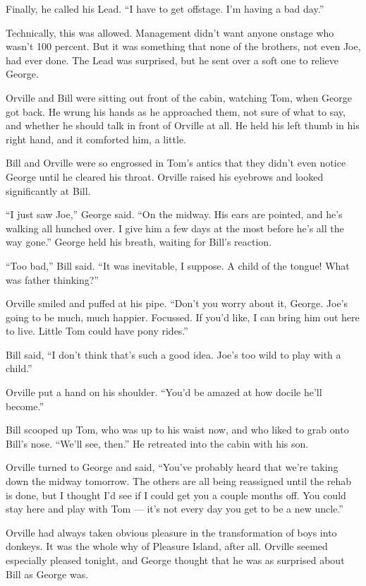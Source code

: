 Finally, he called his Lead.
``I have to get offstage. I'm having a bad day.''

Technically, this was allowed. Management didn't want anyone
onstage who wasn't 100 percent. But it was something that none of
the brothers, not even Joe, had ever done. The Lead was surprised,
but he sent over a soft one to relieve George.

\tb

Orville and Bill were sitting out front of the cabin, watching Tom,
when George got back. He wrung his hands as he approached them, not
sure of what to say, and whether he should talk in front of Orville
at all. He held his left thumb in his right hand, and it comforted
him, a little.

Bill and Orville were so engrossed in Tom's antics that they didn't
even notice George until he cleared his throat. Orville raised his
eyebrows and looked significantly at Bill.

``I just saw Joe,'' George said.
``On the midway. His ears are pointed, and he's walking all hunched over. I 
give him a few days at the most before he's all the way gone.''
George held his breath, waiting for Bill's reaction.

``Too bad,'' Bill said.
``It was inevitable, I suppose. A child of the tongue! What was father 
thinking?''

Orville smiled and puffed at his pipe.
``Don't you worry about it, George. Joe's going to be much, much happier. 
Focussed. If you'd like, I can bring him out here to live. Little Tom could 
have pony rides.''

Bill said,
``I don't think that's such a good idea. Joe's too wild to play with a child.''

Orville put a hand on his shoulder.
``You'd be amazed at how docile he'll become.''

Bill scooped up Tom, who was up to his waist now, and who liked to
grab onto Bill's nose. ``We'll see, then.'' He retreated into the
cabin with his son.

Orville turned to George and said,
``You've probably heard that we're taking down the midway tomorrow. The others 
are all being reassigned until the rehab is done, but I thought I'd see if I 
could get you a couple months off. You could stay here and play with Tom --- 
it's not every day you get to be a new uncle.''

Orville had always taken obvious pleasure in the transformation of
boys into donkeys. It was the whole why of Pleasure Island, after
all. Orville seemed especially pleased tonight, and George thought
that he was as surprised about Bill as George was.

